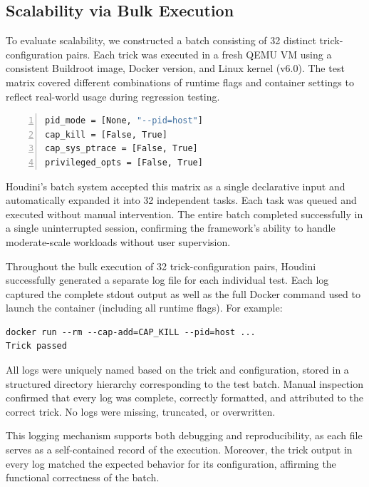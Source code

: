 \documentclass[12pt]{report}
\begin{document}
\begin{doublespace}
\section{Scalability via Bulk Execution}

To evaluate scalability, we constructed a batch consisting of 32 distinct trick-configuration pairs. Each trick was executed in a fresh QEMU VM using a consistent Buildroot image, Docker version, and Linux kernel (v6.0). The test matrix covered different combinations of runtime flags and container settings to reflect real-world usage during regression testing.

\begin{lstlisting}[language=bash, caption={Trick Configuration Parameters}, label={lst:escape-trick}, numbers=left, numberstyle=\tiny, stepnumber=1, frame=single, breaklines=true, backgroundcolor=\color{gray!10}, basicstyle=\ttfamily\footnotesize, showspaces=false, showstringspaces=false]
pid_mode = [None, "--pid=host"]
cap_kill = [False, True]
cap_sys_ptrace = [False, True]
privileged_opts = [False, True]
\end{lstlisting}

Houdini’s batch system accepted this matrix as a single declarative input and automatically expanded it into 32 independent tasks. Each task was queued and executed without manual intervention. The entire batch completed successfully in a single uninterrupted session, confirming the framework’s ability to handle moderate-scale workloads without user supervision.

Throughout the bulk execution of 32 trick-configuration pairs, Houdini successfully generated a separate log file for each individual test. Each log captured the complete stdout output as well as the full Docker command used to launch the container (including all runtime flags). For example:

\begin{verbatim}
docker run --rm --cap-add=CAP_KILL --pid=host ...
Trick passed
\end{verbatim}

All logs were uniquely named based on the trick and configuration, stored in a structured directory hierarchy corresponding to the test batch. Manual inspection confirmed that every log was complete, correctly formatted, and attributed to the correct trick. No logs were missing, truncated, or overwritten.

This logging mechanism supports both debugging and reproducibility, as each file serves as a self-contained record of the execution. Moreover, the trick output in every log matched the expected behavior for its configuration, affirming the functional correctness of the batch.


\end{doublespace}
\end{document}
